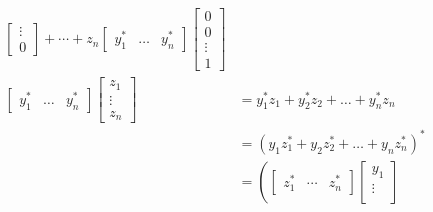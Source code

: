 \documentclass{article}
\begin{document}
\begin{align*}
\begin{bmatrix}
                                                        \vdots \\
                                                        0
                                                      \end{bmatrix} + \cdots + z_n \begin{bmatrix}
                                                                                     y_1^* & \ldots & y_n^*
                                                                                   \end{bmatrix} \begin{bmatrix}
                                                                                                   0      \\
                                                                                                   0      \\
                                                                                                   \vdots \\
                                                                                                   1
                                                                                                 \end{bmatrix}       \\
  \begin{bmatrix}
    y_1^* & \ldots & y_n^*
  \end{bmatrix} \begin{bmatrix}
                  z_1    \\
                  \vdots \\
                  z_n
                \end{bmatrix} & = y_1^* z_1 + y_2^* z_2 + \ldots + y_n^* z_n                                          \\
                                & = (y_1 z_1^* + y_2 z_2^* + \ldots + y_n z_n^*)^*                                    \\
                                & = \left( \begin{bmatrix}
                                             z_1^* & \cdots & z_n^*
                                           \end{bmatrix} \begin{bmatrix}
                                                           y_1    \\
                                                           \vdots \\

\end{bmatrix}
\end{align*}
\end{document}
